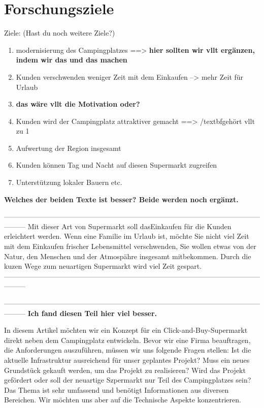 \section{Forschungsziele}

Ziele: (Hast du noch weitere Ziele?)
\begin{enumerate}
    \item modernisierung des Campingplatzes ==> \textbf{hier sollten wir vllt ergänzen, indem wir das und das machen}
    \item Kunden verschwenden weniger Zeit mit dem Einkaufen --> mehr Zeit für Urlaub 
    \item \textbf{das wäre vllt die Motivation oder?}
    \item Kunden wird der Campingplatz attraktiver gemacht ==> /textbf{gehört vllt zu 1}
    \item Aufwertung der Region insgesamt
    \item Kunden können Tag und Nacht auf diesen Supermarkt zugreifen
    \item Unterstützung lokaler Bauern etc.
\end{enumerate}



\textbf{Welches der beiden Texte ist besser? Beide werden noch ergänzt.}

---------------------------------------------------------------------------------------------------------------------
Mit dieser Art von Supermarkt soll dasEinkaufen für die Kunden erleichtert werden. 
Wenn eine Familie im Urlaub ist, möchte Sie nicht viel Zeit mit dem Einkaufen frischer 
Lebensmittel verschwenden, Sie wollen etwas von der Natur, den Menschen und der Atmospähre 
insgesamt mitbekommen. Durch die kuzen Wege zum neuartigen Supermarkt wird viel Zeit gespart.
---------------------------------------------------------------------------------------------------------------------



---------------------------------------------------------------------------------------------------------------------
\textbf{Ich fand diesen Teil hier viel besser.}


In diesem Artikel möchten wir ein Konzept für ein Click-and-Buy-Supermarkt direkt neben dem Campingplatz entwickeln. 
Bevor wir eine Firma beauftragen, die Anforderungen auszuführen, müssen wir uns folgende Fragen stellen: Ist die
aktuelle Infrastruktur ausreichend für unser  geplantes Projekt? Muss ein neues Grundstück gekauft werden, um das 
Projekt zu realisieren? Wird das Projekt gefördert oder soll der neuartige Szpermarkt nur Teil des Campingplatzes sein?
Das Thema ist sehr umfassend und benötigt Informationen aus  diversen Bereichen. Wir möchten uns aber auf die 
Technische Aspekte konzentrieren.



